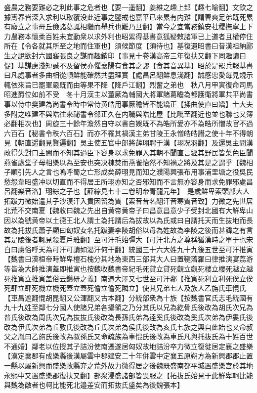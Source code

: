 盛農之務要難必之利此事之危者也【要一遥翻】姜維之趣上邽【趣七喻翻】文欽之據夀春皆深入求利以取覆没此近事之鑒戒也嘉平已來累有内難【謂曹爽足弟既死累有廢立之事毌丘儉諸葛誕相繼而舉兵也難乃旦翻】當今之宜當務鎮安社稷撫寧上下力農務本懷柔百姓未宜動衆以求外利也昭累得基書意狐疑敕諸軍已上道者且權停住所在【令各就其所至之地而住軍也】須候節度【須待也】基復遺昭書曰昔漢祖納酈生之說欲封六國寤張良之謀而趣銷印【事見十卷漢高帝三年復扶又翻下同趣讀曰促】基謀慮淺短誠不及留侯亦懼襄陽有食其之謬【食其音異基】昭於是罷兵報基書曰凡處事者多曲相從順鮮能確然共盡理實【處昌呂翻鮮息淺翻】誠感忠愛每見規示輒依來旨已罷軍嚴既而由等果不降【降戶江翻】烈奮之弟也　秋八月甲寅復命司馬昭進爵位如前不受　冬十月漢主以董厥為輔國大將軍諸葛瞻為都護衛將軍共平尚書事以侍中樊建為尚書令時中常侍黄皓用事厥瞻皆不能矯正【揉曲使直曰矯】士大夫多附之唯建不與皓往來祕書令郤正久在内職與皓比屋【比毗至翻近也並也聯也又簿必翻相次也】周旋三十餘年澹然自守以書自娛既不為皓所愛亦不為皓所憎故官不過六百石【秘書令秩六百石】而亦不罹其禍漢主弟甘陵王永憎皓皓譖之使十年不得朝見【朝直遥翻見賢遍翻】吳主使五官中郎將薛珝聘于漢【珝况羽翻】及還吳主問漢政得失對曰主闇而不知其過臣下容身以求免罪入其朝不聞直言經其野民皆菜色臣聞燕雀處堂子母相樂以為至安也突决棟焚而燕雀怡然不知禍之將及其是之謂乎【魏相子順引先人之言也嗚呼蜀之亡形成矣薛珝見而知之濮陽興張布用事浦里塘之役吳民愁怨韋昭盛冲以切直而不得居王所珝亦知之否邪知而不言無亦容身而求免罪邪處昌呂翻樂音洛】珝綜之子也【薛綜見七十二卷明帝青龍元年】　是歲鮮卑索頭部大人拓跋力微始遣其子沙漠汗入貢因留為質【索音昔名翻汗音寒質音致】力微之先世居北荒不交南夏【魏收曰魏之先出自黄帝黄帝子曰昌意昌意少子受封北國有大鮮卑山因以為號黄帝以土德王北人謂土為托謂后為拔故以為氏或曰自謂托天而生抜地而長故為托拔氏蕭子顯曰匈奴女名托跋妻李陵胡俗以母為姓故為李陵之後而甚諱之有言其是陵後者輒見殺夏戶雅翻】至可汗毛始彊大【可汗北方之尊稱猶漢時之單于也宋白曰虜俗呼天為可汗可讀如渴汗何干翻】統國三十六大姓九十九後五世至可汗推寅【魏書曰漢桓帝時鮮卑檀石槐分其地為東西三部其大人曰置鞬落羅曰律推演宴荔游等皆為大帥推演蓋即推寅也按魏收魏書帝紀毛死貸立貸死觀立觀死樓立樓死越立越死推寅立推寅盖俗云鑽研之義】南遷大澤又七世至可汗鄰【推寅死利立利死俟立俟死肆立肆死機立機死蓋立蓋死儈立儈死隣立】使其兄弟七人及族人乙旃氏車惃氏【車昌遮翻惃胡昆翻又公渾翻又古本翻】分統部衆為十族【按魏書官氏志毛統國有九十九姓至鄰七分國人使諸兄弟各攝領之乃分其氏以兄為紇骨氏後改為胡氏次兄為普氏後改為周氏次兄為抜抜氏後改為長孫氏弟為逹奚氏後改為奚氏次弟為伊婁氏後改為伊氏次弟為丘敦氏後改為丘氏次弟為侯氏後改為亥氏七族之興自此始也又命叔父之胤曰乙旃氏後改為叔孫氏又命疏族為車惃氏後改為車氏凡與托抜氏為十姓百世不通婚】鄰老以位授其子詰汾使南遷遂居匈奴故地詰汾卒力微立復徙居定襄之盛樂【漢定襄郡有成樂縣後漢屬雲中郡建安二十年併雲中定襄五原朔方為新興郡郡止置一縣以屬新興而盛樂故縣弃之荒外故力微得居之後魏既盛南都平城置盛樂宫於其地永熙中又置盛樂郡復扶又翻】部衆浸盛諸部皆畏服之【拓抜氏始見于此鮮卑軻比能與魏為敵者也軻比能死北邉差安而拓抜氏盛矣為後魏張本】

